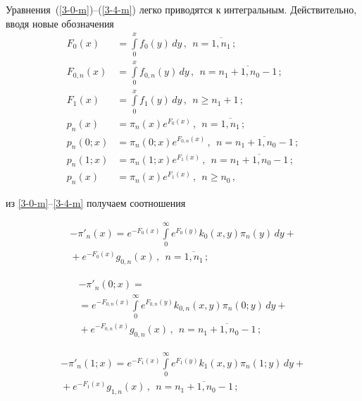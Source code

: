 \begin{multicols}{2}
Уравнения~(\ref{3-0-m})--(\ref{3-4-m}) легко приводятся к
интегральным. Действительно, вводя новые обозначения
\begin{align*}
F_0(x) &= \int\limits_0^x f_0(y)\, dy\,,
\ \ n=\overline{1,n_1}\,;
\\
F_{0,n}(x) &= \int\limits_0^x f_{0,n}(y)\, dy\,,
\ \ n=\overline{n_1+1,n_0-1}\,;
\\
F_{1}(x)&= \int\limits_0^x f_{1}(y)\, dy\,,
\ \ n\ge n_1+1\,;
\\
p_n(x) &= \pi_n(x) e^{F_0(x)} \,, \ \ n=\overline{1,n_1}\,;
\\
p_n(0;x) &= \pi_n(0;x) e^{F_{0,n}(x)} \,, \ \ n=\overline{n_1+1,n_0-1}\,;
\\
p_n(1;x) &= \pi_n(1;x) e^{F_{1}(x)} \,, \ \ n=\overline{n_1+1,n_0-1}\,;
\\
p_n(x) &= \pi_n(x) e^{F_{1}(x)} \,, \ \ n\ge n_0\,,
\end{align*}



\noindent
из \eqref{3-0-m}--\eqref{3-4-m} получаем соотношения

\noindent
\begin{multline}
\label{pi-1-m}
-\pi'_n(x) = e^{-F_0(x)} \int\limits_0^\infty e^{F_0(y)} k_0(x,y) \pi_n(y)\, dy
+{}\\
{}+
e^{-F_0(x)} g_{0,n}(x) \,,
\ \ n=\overline{1,n_1}\,;
\end{multline}

\vspace*{-12pt}

\noindent
\begin{multline}
\label{pi-2-m}
-\pi'_n(0;x) = {}\\
{}=e^{-F_{0,n}(x)} \int\limits_0^\infty e^{F_{0,n}(y)} 
k_{0,n}(x,y) \pi_n(0;y)\, dy +{}\\
{}+
e^{-F_{0,n}(x)} g_{0,n}(x) \,, \ \ n=\overline{n_1+1,n_0-1}\,;
\end{multline}

\vspace*{-12pt}

\noindent
\begin{multline}
\label{pi-3-m}
-\pi'_n(1;x) = e^{-F_{1}(x)} \int\limits_0^\infty e^{F_{1}(y)} k_{1}(x,y) \pi_n(1;y)\, dy
+{}\\
{}+
e^{-F_{1}(x)} g_{1,n}(x) \,, \ \ n=\overline{n_1+1,n_0-1}\,;
\end{multline}


\end{multicols}
